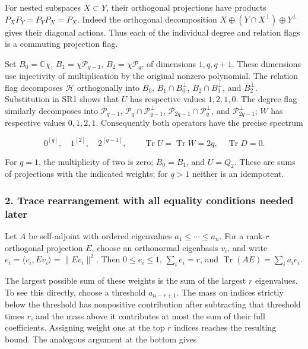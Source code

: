 For nested subspaces \(X\subset Y\), their orthogonal projections have products \(P_XP_Y=P_YP_X=P_X\). Indeed the orthogonal decomposition \(X\oplus(Y\cap X^\perp)\oplus Y^\perp\) gives their diagonal actions. Thus each of the individual degree and relation flags is a commuting projection flag.

Set \(B_0=\mathbb C\chi\), \(B_1=\chi\mathcal P_{q-1}\), \(B_2=\chi\mathcal P_q\), of dimensions \(1,q,q+1\). These dimensions use injectivity of multiplication by the original nonzero polynomial. The relation flag decomposes \(\mathcal H\) orthogonally into \(B_0\), \(B_1\cap B_0^\perp\), \(B_2\cap B_1^\perp\), and \(B_2^\perp\). Substitution in SR1 shows that \(U\) has respective values \(1,2,1,0\). The degree flag similarly decomposes into \(\mathcal P_{q-1}\), \(\mathcal P_q\cap\mathcal P_{q-1}^\perp\), \(\mathcal P_{2q-1}\cap\mathcal P_q^\perp\), and \(\mathcal P_{2q-1}^\perp\); \(W\) has respective values \(0,1,2,1\). Consequently both operators have the precise spectrum

\[
0^{[q]},\quad 1^{[2]},\quad 2^{[q-1]},
\qquad \operatorname{Tr}U=\operatorname{Tr}W=2q,\quad
\operatorname{Tr}D=0.
\tag{SR2}
\]

For \(q=1\), the multiplicity of two is zero; \(B_0=B_1\), and \(U=Q_2\). These are sums of projections with the indicated weights; for \(q>1\) neither is an idempotent.

\subsubsection{2. Trace rearrangement with all equality conditions needed later}\label{endpoint-four_window_sharpness_review--trace-rearrangement-with-all-equality-conditions-needed-later}

Let \(A\) be self-adjoint with ordered eigenvalues \(a_1\le\cdots\le a_n\). For a rank-\(r\) orthogonal projection \(E\), choose an orthonormal eigenbasis \(v_i\), and write \(e_i=\langle v_i,Ev_i\rangle=\|Ev_i\|^2\). Then \(0\le e_i\le1\), \(\sum_i e_i=r\), and \(\operatorname{Tr}(AE)=\sum_i a_ie_i\).

The largest possible sum of these weights is the sum of the largest \(r\) eigenvalues. To see this directly, choose a threshold \(a_{n-r+1}\). The mass on indices strictly below the threshold has nonpositive contribution after subtracting that threshold times \(r\), and the mass above it contributes at most the sum of their full coefficients. Assigning weight one at the top \(r\) indices reaches the resulting bound. The analogous argument at the bottom gives


